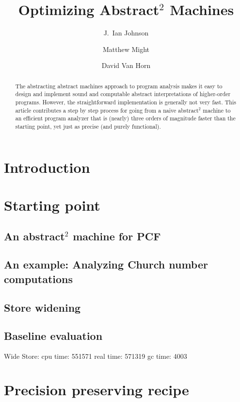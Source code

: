 \documentclass{llncs}
\begin{document}
\title{Optimizing Abstract$^2$ Machines}
%
\frontmatter          %
%
\author{J.~Ian Johnson \and Matthew Might \and David Van Horn}

\maketitle              %

\begin{abstract}
The abstracting abstract machines approach to program analysis makes
it easy to design and implement sound and computable abstract
interpretations of higher-order programs.
%
However, the straightforward implementation is generally
not very fast.
%
This article contributes a step by step process for going from a naive
abstract$^2$ machine to an efficient program analyzer that is (nearly)
three orders of magnitude faster than the starting point, yet just as
precise (and purely functional).
\end{abstract}
%
\section{Introduction}

\section{Starting point}
\subsection{An abstract$^2$ machine for PCF}
\subsection{An example: Analyzing Church number computations}
\subsection{Store widening}

\subsection{Baseline evaluation}

Wide Store: cpu time: 551571 real time: 571319 gc time: 4003

\section{Precision preserving recipe}
\end{document}
